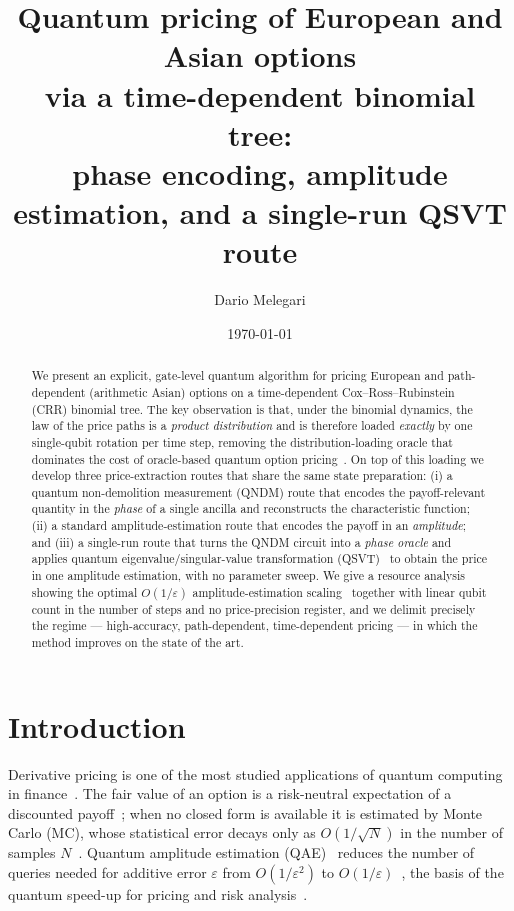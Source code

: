 \documentclass[11pt]{article}
\title{\textbf{Quantum pricing of European and Asian options\\ via a time-dependent binomial tree:\\ phase encoding, amplitude estimation, and a single-run QSVT route}}
\author{Dario Melegari}
\date{\today}
\begin{document}
\maketitle

\begin{abstract}
\noindent
We present an explicit, gate-level quantum algorithm for pricing European and path-dependent (arithmetic Asian) options on a time-dependent Cox--Ross--Rubinstein (CRR) binomial tree. The key observation is that, under the binomial dynamics, the law of the price paths is a \emph{product distribution} and is therefore loaded \emph{exactly} by one single-qubit rotation per time step, removing the distribution-loading oracle that dominates the cost of oracle-based quantum option pricing~\cite{Stamatopoulos_2020,chakrabarti2021threshold}. On top of this loading we develop three price-extraction routes that share the same state preparation: (i) a quantum non-demolition measurement (QNDM) route that encodes the payoff-relevant quantity in the \emph{phase} of a single ancilla and reconstructs the characteristic function; (ii) a standard amplitude-estimation route that encodes the payoff in an \emph{amplitude}; and (iii) a single-run route that turns the QNDM circuit into a \emph{phase oracle} and applies quantum eigenvalue/singular-value transformation (QSVT)~\cite{gilyen2019qsvt,dong2022qetu,martyn2021grand} to obtain the price in one amplitude estimation, with no parameter sweep. We give a resource analysis showing the optimal $O(1/\varepsilon)$ amplitude-estimation scaling~\cite{brassard2002amplitude,montanaro2015quantum} together with linear qubit count in the number of steps and no price-precision register, and we delimit precisely the regime --- high-accuracy, path-dependent, time-dependent pricing --- in which the method improves on the state of the art.
\end{abstract}

\tableofcontents
\newpage

\section{Introduction}

Derivative pricing is one of the most studied applications of quantum computing in finance~\cite{rebentrost2018finance,woerner2019riskanalysis,Stamatopoulos_2020,chakrabarti2021threshold}. The fair value of an option is a risk-neutral expectation of a discounted payoff~\cite{hull2018options,blackscholes1973}; when no closed form is available it is estimated by Monte Carlo (MC), whose statistical error decays only as $O(1/\sqrt{N})$ in the number of samples $N$~\cite{glasserman2004monte}. Quantum amplitude estimation (QAE)~\cite{brassard2002amplitude} reduces the number of queries needed for additive error $\varepsilon$ from $O(1/\varepsilon^2)$ to $O(1/\varepsilon)$~\cite{montanaro2015quantum,suzuki2020amplitude,herbert2022qmci}, the basis of the quantum speed-up for pricing and risk analysis~\cite{Stamatopoulos_2020,woerner2019riskanalysis,egger2020credit}.
\end{document}
